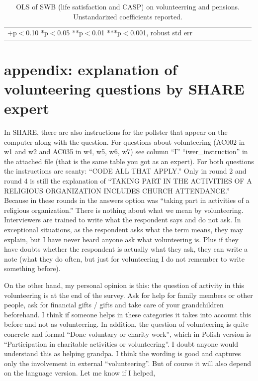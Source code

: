 \documentclass[10pt, letterpaper]{article}
\begin{document}
\begin{spacing}{1.4}






\begin{spacing}{.9}
\begin{table}[H]\centering \caption{OLS of SWB  (life satisfaction and CASP) on
    volunteerring and pensions.  Unstandarized coefficients reported.}  \begin{scriptsize} \begin{tabular}{p{1.8in}p{.5in}p{.5in}p{.5in}p{.5in}|p{.5in}p{.5in}p{.5in}p{.5in}p{.5in}p{.4in}p{.5in}p{.4in}}\hline 
      \hline\multicolumn{5}{l}{+p$<$0.10 *p$<$0.05 **p$<$0.01 ***p$<$0.001,
        robust std err} \end{tabular}\label{regEw6w4} \end{scriptsize}\end{table}
\end{spacing}



\section{appendix: explanation of volunteering questions by SHARE expert}%

In SHARE, there are also instructions for the pollster that appear on the
computer along with the question. For questions about volunteering (AC002 in w1
and w2 and AC035 in w4, w5, w6, w7) see column ``I'' ``iwer\_instruction'' in the
attached file (that is the same table you got as an expert).
For both questions the instructions are scanty: ``CODE ALL THAT APPLY.'' Only in
round 2 and round 4 is still the explanation of ``TAKING PART IN THE ACTIVITIES
OF A RELIGIOUS ORGANIZATION INCLUDES CHURCH ATTENDANCE.'' Because in these
rounds in the answers option was ``taking part in activities of a religious
organization.'' There is nothing about what we mean by
volunteering. Interviewers are trained to write what the respondent says and do
not ask. In exceptional situations, as the respondent asks what the term means,
they may explain, but I have never heard anyone ask what volunteering is. Plus
if they have doubts whether the respondent is actually what they ask, they can
write a note (what they do often, but just for volunteering I do not remember to
write something before).

On the other hand, my personal opinion is this: the question of activity in this
volunteering is at the end of the survey. Ask for help for family members or
other people, ask for financial gifts / gifts and take care of your
grandchildren beforehand. I think if someone helps in these categories it takes
into account this before and not as volunteering.
In addition, the question of volunteering is quite concrete and formal ``Done
voluntary or charity work'', which in Polish version is ``Participation in
charitable activities or volunteering''. I doubt anyone would understand this as
helping grandpa. I think the wording is good and captures only the involvement
in external ``volunteering''. But of course it will also depend on the language
version.
Let me know if I helped,

\end{spacing}
\end{document}
